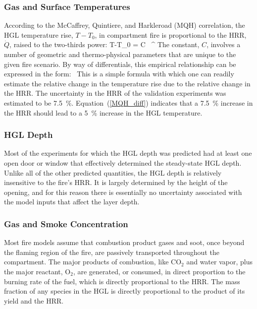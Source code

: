 \subsubsection{Gas and Surface Temperatures}

According to the McCaffrey, Quintiere, and Harkleroad (MQH) correlation, the HGL temperature rise, $T-T_0$, in compartment fire is proportional to the HRR, $\dot{Q}$, raised to the two-thirds power:
\be
   T-T_0 = C \, ^{}
\ee
The constant, $C$, involves a number of geometric and thermo-physical parameters that are unique to the given fire scenario. By way of differentials, this empirical relationship can be expressed in the form:
\be
    \approx {} \,  \label{MQH_diff}
\ee
This is a simple formula with which one can readily estimate the relative change in the temperature rise due to the relative change in the HRR. The uncertainty in the HRR of the validation experiments was estimated to be 7.5~\%. Equation~(\ref{MQH_diff}) indicates that a 7.5~\% increase in the HRR should lead to a 5~\% increase in the HGL temperature.

\subsubsection{HGL Depth}

Most of the experiments for which the HGL depth was predicted had at least one open door or window that effectively determined the steady-state HGL depth. Unlike all of the other predicted quantities, the HGL depth is relatively insensitive to the fire's HRR. It is largely determined by the height of the opening, and for this reason there is essentially no uncertainty associated with the model inputs that affect the layer depth.

\subsubsection{Gas and Smoke Concentration}

Most fire models assume that combustion product gases and soot, once beyond the flaming region of the fire, are passively transported throughout the compartment. The major products of combustion, like CO$_2$ and water vapor, plus the major reactant, O$_2$, are generated, or consumed, in direct proportion to the burning rate of the fuel, which is directly proportional to the HRR. The mass fraction of any species in the HGL is directly proportional to the product of its yield and the HRR.

